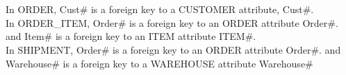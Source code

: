 \documentclass[12pt]{article}
\begin{document}
\section{}
In ORDER, Cust\# is a foreign key to a CUSTOMER attribute, Cust\#.\\
In ORDER\_ITEM, Order\# is a foreign key to an ORDER attribute Order\#. and Item\# is a foreign key to an ITEM attribute ITEM\#.\\
In SHIPMENT, Order\# is a foreign key to an ORDER attribute Order\#. and Warehouse\# is a foreign key to a WAREHOUSE attribute Warehouse\#\\
\newpage
\end{document}
